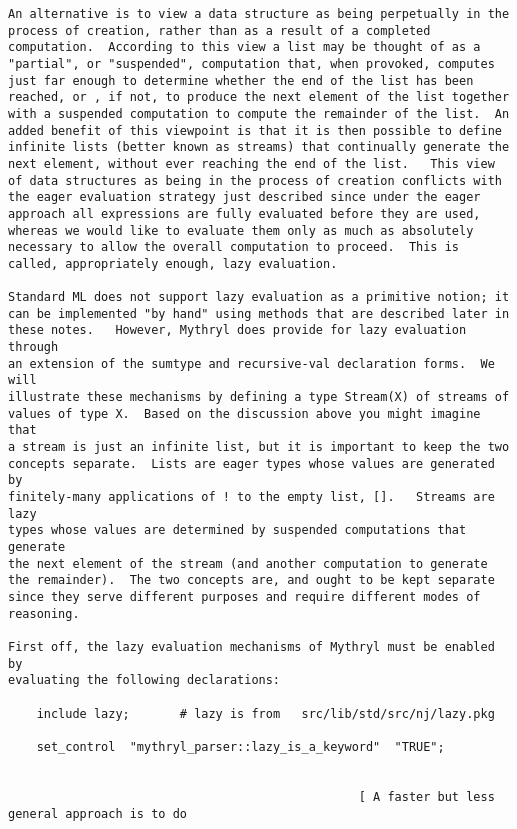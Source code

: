 \begin{verbatim}
An alternative is to view a data structure as being perpetually in the 
process of creation, rather than as a result of a completed 
computation.  According to this view a list may be thought of as a 
"partial", or "suspended", computation that, when provoked, computes 
just far enough to determine whether the end of the list has been 
reached, or , if not, to produce the next element of the list together 
with a suspended computation to compute the remainder of the list.  An 
added benefit of this viewpoint is that it is then possible to define 
infinite lists (better known as streams) that continually generate the 
next element, without ever reaching the end of the list.   This view 
of data structures as being in the process of creation conflicts with 
the eager evaluation strategy just described since under the eager 
approach all expressions are fully evaluated before they are used, 
whereas we would like to evaluate them only as much as absolutely 
necessary to allow the overall computation to proceed.  This is 
called, appropriately enough, lazy evaluation. 
 
Standard ML does not support lazy evaluation as a primitive notion; it 
can be implemented "by hand" using methods that are described later in 
these notes.   However, Mythryl does provide for lazy evaluation through 
an extension of the sumtype and recursive-val declaration forms.  We will 
illustrate these mechanisms by defining a type Stream(X) of streams of 
values of type X.  Based on the discussion above you might imagine that 
a stream is just an infinite list, but it is important to keep the two 
concepts separate.  Lists are eager types whose values are generated by 
finitely-many applications of ! to the empty list, [].   Streams are lazy 
types whose values are determined by suspended computations that generate 
the next element of the stream (and another computation to generate 
the remainder).  The two concepts are, and ought to be kept separate 
since they serve different purposes and require different modes of 
reasoning. 
 
First off, the lazy evaluation mechanisms of Mythryl must be enabled by 
evaluating the following declarations: 
 
    include lazy;       # lazy is from   src/lib/std/src/nj/lazy.pkg  
 
    set_control  "mythryl_parser::lazy_is_a_keyword"  "TRUE"; 
 
 
                                                 [ A faster but less general approach is to do 
 

\end{verbatim}
